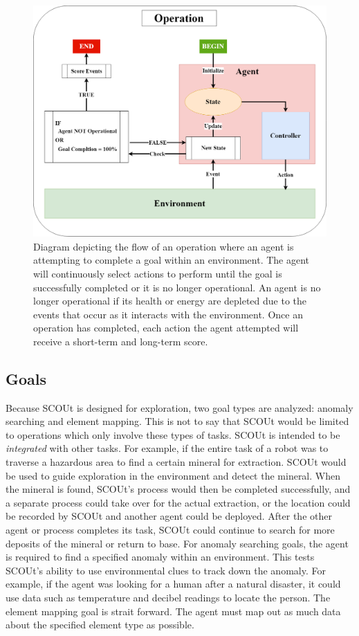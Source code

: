 \begin{figure}[H]
  \centering
  \includegraphics[width=1.0\columnwidth]{Figures/operation.png}
  \caption{Diagram depicting the flow of an operation where an agent is attempting to complete a goal within an environment. The agent will continuously select actions to perform until the goal is successfully completed or it is no longer operational. An agent is no longer operational if its health or energy are depleted due to the events that occur as it interacts with the environment. Once an operation has completed, each action the agent attempted will receive a short-term and long-term score.}
  \label{fig:operation}
\end{figure}


\subsection{Goals} \label{subsec:goals}
Because SCOUt is designed for exploration, two goal types are analyzed: anomaly searching and element mapping.
This is not to say that SCOUt would be limited to operations which only involve these types of tasks.
SCOUt is intended to be \textit{integrated} with other tasks.
For example, if the entire task of a robot was to traverse a hazardous area to find a certain mineral for extraction.
SCOUt would be used to guide exploration in the environment and detect the mineral.
When the mineral is found, SCOUt's process would then be completed successfully, and a separate process could take over for the actual extraction, or the location could be recorded by SCOUt and another agent could be deployed.
After the other agent or process completes its task, SCOUt could continue to search for more deposits of the mineral or return to base.
For anomaly searching goals, the agent is required to find a specified anomaly within an environment.
This tests SCOUt's ability to use environmental clues to track down the anomaly.
For example, if the agent was looking for a human after a natural disaster, it could use data such as temperature and decibel readings to locate the person.
The element mapping goal is strait forward.
The agent must map out as much data about the specified element type as possible.


